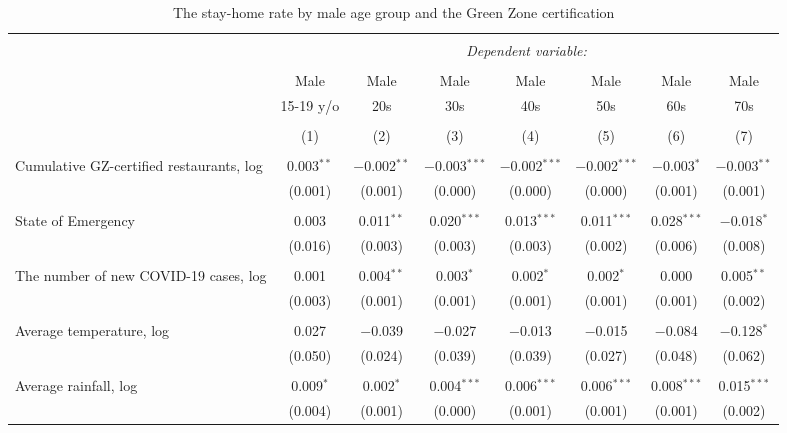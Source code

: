 
\begin{table}[H] \centering 
  \caption{The stay-home rate by male age group and the Green Zone certification} 
  \label{} 
\footnotesize 
\begin{tabular}{@{\extracolsep{-11pt}}lccccccc} 
\\[-1.8ex]\hline 
\hline \\[-1.8ex] 
 & \multicolumn{7}{c}{\textit{Dependent variable:}} \\ 
\cline{2-8} 
\\[-1.8ex] & Male & Male & Male & Male & Male & Male & Male \\ 
 & 15-19 y/o & 20s & 30s & 40s & 50s & 60s & 70s \\ 
\\[-1.8ex] & (1) & (2) & (3) & (4) & (5) & (6) & (7)\\ 
\hline \\[-1.8ex] 
 Cumulative GZ-certified restaurants, log & 0.003$^{**}$ & $-$0.002$^{**}$ & $-$0.003$^{***}$ & $-$0.002$^{***}$ & $-$0.002$^{***}$ & $-$0.003$^{*}$ & $-$0.003$^{**}$ \\ 
  & (0.001) & (0.001) & (0.000) & (0.000) & (0.000) & (0.001) & (0.001) \\ 
  & & & & & & & \\ 
 State of Emergency & 0.003 & 0.011$^{**}$ & 0.020$^{***}$ & 0.013$^{***}$ & 0.011$^{***}$ & 0.028$^{***}$ & $-$0.018$^{*}$ \\ 
  & (0.016) & (0.003) & (0.003) & (0.003) & (0.002) & (0.006) & (0.008) \\ 
  & & & & & & & \\ 
 The number of new COVID-19 cases, log & 0.001 & 0.004$^{**}$ & 0.003$^{*}$ & 0.002$^{*}$ & 0.002$^{*}$ & 0.000 & 0.005$^{**}$ \\ 
  & (0.003) & (0.001) & (0.001) & (0.001) & (0.001) & (0.001) & (0.002) \\ 
  & & & & & & & \\ 
 Average temperature, log & 0.027 & $-$0.039 & $-$0.027 & $-$0.013 & $-$0.015 & $-$0.084 & $-$0.128$^{*}$ \\ 
  & (0.050) & (0.024) & (0.039) & (0.039) & (0.027) & (0.048) & (0.062) \\ 
  & & & & & & & \\ 
 Average rainfall, log & 0.009$^{*}$ & 0.002$^{*}$ & 0.004$^{***}$ & 0.006$^{***}$ & 0.006$^{***}$ & 0.008$^{***}$ & 0.015$^{***}$ \\ 
  & (0.004) & (0.001) & (0.000) & (0.001) & (0.001) & (0.001) & (0.002) \\ 

\end{tabular}
\end{table}

